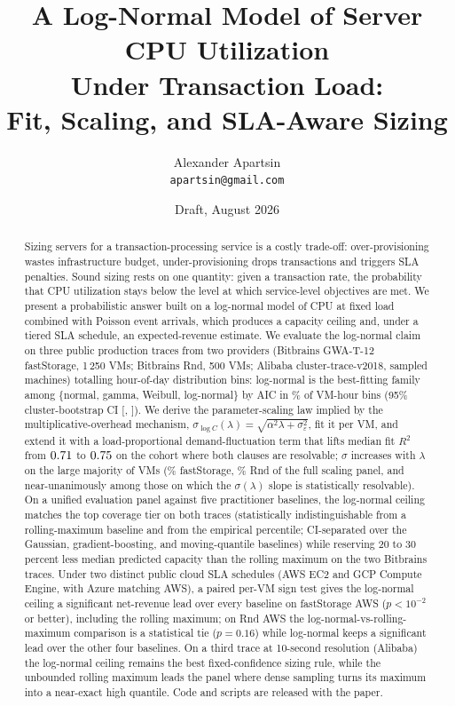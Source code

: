 \documentclass[11pt,a4paper]{article}
\title{A Log-Normal Model of Server CPU Utilization\\ Under Transaction Load:\\
       Fit, Scaling, and SLA-Aware Sizing}
\author{Alexander Apartsin\\
        \small\texttt{apartsin@gmail.com}}
\date{Draft, August 2026}
\begin{document}
\maketitle

\begin{abstract}
Sizing servers for a transaction-processing service is a costly trade-off:
over-provisioning wastes infrastructure budget, under-provisioning drops
transactions and triggers SLA penalties. Sound sizing rests on one
quantity: given a transaction rate, the probability that CPU utilization
stays below the level at which service-level objectives are met. We
present a probabilistic answer built on a log-normal model of CPU at
fixed load combined with Poisson event arrivals, which produces a
capacity ceiling and, under a tiered SLA schedule, an expected-revenue
estimate. We evaluate the log-normal claim on three public production
traces from two providers (Bitbrains GWA-T-12 fastStorage, 1\,250 VMs;
Bitbrains Rnd, 500 VMs; Alibaba cluster-trace-v2018, \AliVms{} sampled
machines) totalling \CombinedNBins{} hour-of-day distribution bins:
log-normal is the best-fitting family among \{normal, gamma, Weibull,
log-normal\} by AIC in \CombinedLogNormShareVmw{}\% of VM-hour bins
(95\% cluster-bootstrap CI
[\CombinedLogNormShareCiLo, \CombinedLogNormShareCiHi]).
We derive the parameter-scaling law implied by the multiplicative-overhead
mechanism, $\sigma_{\log C}(\lambda) = \sqrt{\alpha^2\lambda + \sigma_\varepsilon^2}$,
fit it per VM, and extend it with a load-proportional demand-fluctuation
term that lifts median fit $R^2$ from $0.71$ to $0.75$ on
the cohort where both clauses are resolvable; $\sigma$ increases with
$\lambda$ on the large majority of VMs (\SigDirFsFull\% fastStorage,
\SigDirRnFull\% Rnd of the full scaling panel, and near-unanimously among
those on which the $\sigma(\lambda)$ slope is statistically resolvable).
On a unified evaluation panel against five
practitioner baselines, the log-normal ceiling matches the top coverage
tier on both traces (statistically indistinguishable from a
rolling-maximum baseline and from the empirical percentile; CI-separated
over the Gaussian, gradient-boosting, and moving-quantile baselines)
while reserving 20 to 30 percent less median predicted capacity than the
rolling maximum on the two Bitbrains traces. Under two distinct public
cloud SLA schedules (AWS EC2 and GCP Compute Engine, with Azure matching
AWS), a paired per-VM sign test gives the log-normal ceiling a
significant net-revenue lead over every baseline on fastStorage AWS
($p < 10^{-2}$ or better), including the rolling maximum; on Rnd AWS the
log-normal-vs-rolling-maximum comparison is a statistical tie
($p = 0.16$) while log-normal keeps a significant lead over the other
four baselines. On a third trace at 10-second resolution (Alibaba) the
log-normal ceiling remains the best fixed-confidence sizing rule, while
the unbounded rolling maximum leads the panel where dense sampling turns
its maximum into a near-exact high quantile. Code and
scripts are released with the paper.
\end{abstract}
\end{document}
